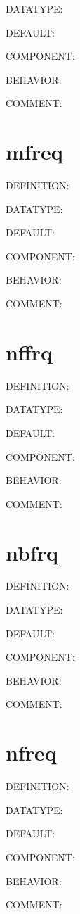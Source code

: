 {\color{green}DATATYPE:}

{\color{blue}DEFAULT:}

{\color{brown}COMPONENT:}

{\color{purple}BEHAVIOR:}

{\color{olive}COMMENT:}

\section{mfreq}
{\color{red}DEFINITION:}

{\color{green}DATATYPE:}

{\color{blue}DEFAULT:}

{\color{brown}COMPONENT:}

{\color{purple}BEHAVIOR:}

{\color{olive}COMMENT:}

\section{nffrq}
{\color{red}DEFINITION:}

{\color{green}DATATYPE:}

{\color{blue}DEFAULT:}

{\color{brown}COMPONENT:}

{\color{purple}BEHAVIOR:}

{\color{olive}COMMENT:}

\section{nbfrq}
{\color{red}DEFINITION:}

{\color{green}DATATYPE:}

{\color{blue}DEFAULT:}

{\color{brown}COMPONENT:}

{\color{purple}BEHAVIOR:}

{\color{olive}COMMENT:}

\section{nfreq}
{\color{red}DEFINITION:}

{\color{green}DATATYPE:}

{\color{blue}DEFAULT:}

{\color{brown}COMPONENT:}

{\color{purple}BEHAVIOR:}

{\color{olive}COMMENT:}

